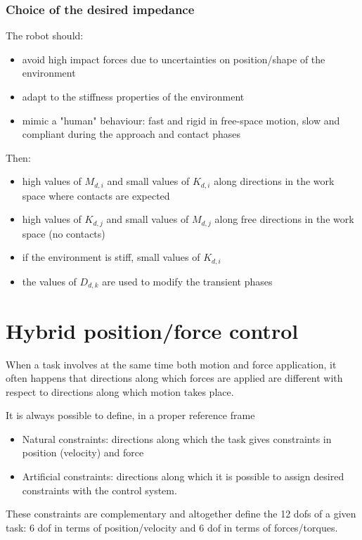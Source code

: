 \documentclass{book}
\begin{document}
\subsubsection{Choice of the desired impedance}
The robot should:
\begin{itemize}
    \item avoid high impact forces due to uncertainties on position/shape of the environment 
    \item adapt to the stiffness properties of the environment 
    \item mimic a "human" behaviour: fast and rigid in free-space motion, slow and compliant during the approach and contact phases 
\end{itemize}
Then:
\begin{itemize}
    \item high values of $M_{d,i}$ and small values of $K_{d,i}$ along directions in the work space where contacts are expected 
    \item high values of $K_{d,j}$ and small values of $M_{d,j}$ along free directions in the work space (no contacts) 
    \item if the environment is stiff, small values of $K_{d,i}$ 
    \item the values of $D_{d,k}$ are used to modify the transient phases
\end{itemize}

\section{Hybrid position/force control}
When a task involves at the same time both motion and force application, it often happens that directions along which forces are applied are different with respect to directions along which motion takes place.

It is always possible to define, in a proper reference frame 
\begin{itemize}
    \item Natural constraints: directions along which the task gives constraints in position (velocity) and force 
    \item Artificial constraints: directions along which it is possible to assign desired constraints with the control system. 
\end{itemize}
These constraints are complementary and altogether define the 12 dofs of a given task: 6 dof in terms of position/velocity and 6 dof in terms of forces/torques. 
\end{document}
